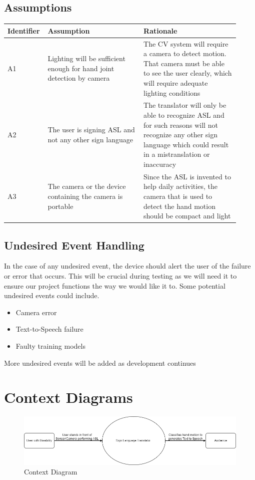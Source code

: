 \documentclass[12pt]{article}
\begin{document}
\subsection{Assumptions}

\renewcommand{\arraystretch}{1.2}
\noindent \begin{tabularx}{\textwidth}{p{0.12\linewidth}|p{0.4\linewidth}|p{0.4\linewidth}}
\toprule
\textbf{Identifier} & \textbf{Assumption} & \textbf{Rationale}\\
\midrule
A1 
& Lighting will be sufficient enough for hand joint detection by camera 
& The CV system will require a camera to detect motion. That camera must be able to see the user clearly, 
which will require adequate lighting conditions\\
\hline
A2
& The user is signing ASL and not any other sign language
& The translator will only be able to recognize ASL and for such reasons will not recognize any other sign language 
which could result in a mistranslation or inaccuracy\\
\hline
A3
& The camera or the device containing the camera is portable
& Since the ASL is invented to help daily activities, the camera that is used to detect the hand motion should be compact and light\\
\bottomrule
\end{tabularx}

\subsection{Undesired Event Handling}
In the case of any undesired event, the device should alert the user of the failure or error 
that occurs. This will be crucial during testing as we will need it to ensure our project functions
the way we would like it to. Some potential undesired events could include.
\begin{itemize}
    \item Camera error
    \item Text-to-Speech failure
    \item Faulty training models
\end{itemize}
More undesired events will be added as development continues


\section{Context Diagrams}

\begin{figure}[H] 
\centering
\includegraphics[width=1\textwidth]{Context Diagram} 
\caption{Context Diagram} 
\label{Fig.Context_Diagram} 
\end{figure}
\end{document}
